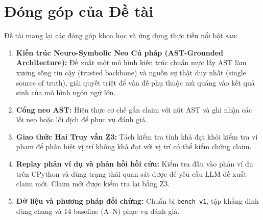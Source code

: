 \section{Đóng góp của Đề tài}
\label{sec:contributions}
Đề tài mang lại các đóng góp khoa học và ứng dụng thực tiễn nổi bật sau:
\begin{enumerate}
    \item \textbf{Kiến trúc Neuro-Symbolic Neo Cú pháp (AST-Grounded Architecture):} Đề xuất một mô hình kiến trúc chuẩn mực lấy AST làm xương sống tin cậy (trusted backbone) và nguồn sự thật duy nhất (single source of truth), giải quyết triệt để vấn đề phụ thuộc mù quáng vào kết quả sinh của mô hình ngôn ngữ lớn.
    \item \textbf{Cổng neo AST:} Hiện thực cơ chế gắn claim với nút AST và ghi nhận các lỗi neo hoặc lỗi dịch để phục vụ đánh giá.
    \item \textbf{Giao thức Hai Truy vấn Z3:} Tách kiểm tra tính khả đạt khỏi kiểm tra vi phạm để phân biệt vị trí không khả đạt với vị trí có thể kiểm chứng claim.
    \item \textbf{Replay phản ví dụ và phản hồi hồi cứu:} Kiểm tra đầu vào phản ví dụ trên CPython và dùng trạng thái quan sát được để yêu cầu LLM đề xuất claim mới. Claim mới được kiểm tra lại bằng Z3.
    \item \textbf{Dữ liệu và phương pháp đối chứng:} Chuẩn bị \texttt{bench\_v1}, tập khẳng định dùng chung và 14 baseline (A--N) phục vụ đánh giá.
\end{enumerate}

